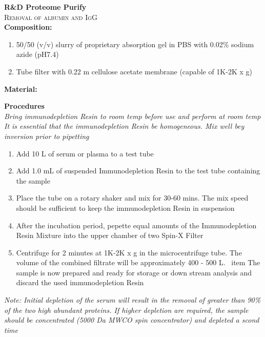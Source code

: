 \textbf{R&D Proteome Purify} 
\\
\textsc{Removal of albumin and IgG}
\\
\textbf{Composition:} 
\begin{enumerate}
    \item{50/50 (v/v) slurry of proprietary absorption gel in PBS with 0.02\% sodium azide (pH7.4)}
    \item{Tube filter with 0.22 \mu m cellulose acetate membrane (capable of 1K-2K x g)}
\end{enumerate}

\textbf{Material:}
\\

\textbf{Procedures}
\\
\textit{Bring immunodepletion Resin to room temp before use and perform at room temp} \\
\textit{It is essential that the immunodepletion Resin be homogeneous. Mix well bey inversion prior to pipetting}
\begin{enumerate}
    \item {Add 10 \mu L of serum or plasma to a test tube}
    \item {Add 1.0 mL of suspended Immunodepletion Resin to the test tube containing the sample}
    \item {Place the tube on a rotary shaker and mix for 30-60 mins. The mix speed should be sufficient to keep the immunodepletion Resin in suspension}
    \item {After the incubation period, pepette equal amounts of the Immunodepletion Resin Mixture into the upper chamber of two Spin-X Filter}
    \item {Centrifuge for 2 minutes at 1K-2K x g in the microcentrifuge tube. The volume of the combined filtrate will be approximately 400 - 500 \mu L.}
    \ item {The sample is now prepared and ready for storage or down stream analysis and discard the used immunodepletion Resin}
\end{enumerate}
\footnotesize
\textit{Note: Initial depletion of the serum will result in the removal of greater than 90\% of the two high abundant proteins. If higher depletion are required, the sample should be concentrated (5000 Da MWCO spin concentrator) and depleted a scond time}
